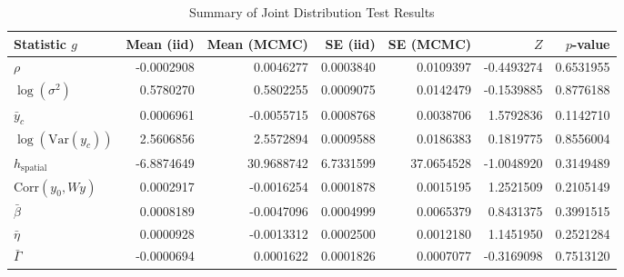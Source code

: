 \begin{table}

\caption{Summary of Joint Distribution Test Results}
\centering
\begin{tabular}[t]{lrrrrrr}
\toprule
Statistic $g$ & Mean (iid) & Mean (MCMC) & SE (iid) & SE (MCMC) & $Z$ & $p$-value\\
\midrule
$\rho$ & -0.0002908 & 0.0046277 & 0.0003840 & 0.0109397 & -0.4493274 & 0.6531955\\
$\log(\sigma^2)$ & 0.5780270 & 0.5802255 & 0.0009075 & 0.0142479 & -0.1539885 & 0.8776188\\
$\bar{y}_c$ & 0.0006961 & -0.0055715 & 0.0008768 & 0.0038706 & 1.5792836 & 0.1142710\\
$\log(\mathrm{Var}(y_c))$ & 2.5606856 & 2.5572894 & 0.0009588 & 0.0186383 & 0.1819775 & 0.8556004\\
$h_{\text{spatial}}$ & -6.8874649 & 30.9688742 & 6.7331599 & 37.0654528 & -1.0048920 & 0.3149489\\
\addlinespace
$\mathrm{Corr}(y_0, Wy)$ & 0.0002917 & -0.0016254 & 0.0001878 & 0.0015195 & 1.2521509 & 0.2105149\\
$\bar{\beta}$ & 0.0008189 & -0.0047096 & 0.0004999 & 0.0065379 & 0.8431375 & 0.3991515\\
$\bar{\eta}$ & 0.0000928 & -0.0013312 & 0.0002500 & 0.0012180 & 1.1451950 & 0.2521284\\
$\bar{\Gamma}$ & -0.0000694 & 0.0001622 & 0.0001826 & 0.0007077 & -0.3169098 & 0.7513120\\
\bottomrule
\end{tabular}
\end{table}